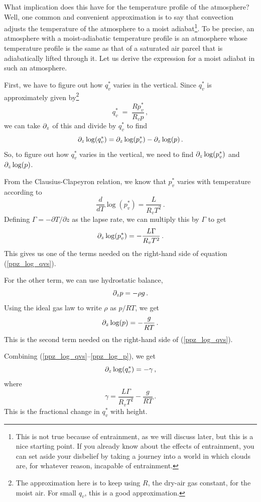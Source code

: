 \documentclass[12pt]{article}
\begin{document}
What implication does this have for the temperature profile of the atmosphere?  Well, one common and convenient approximation is to say that convection adjusts the temperature of the atmosphere to a moist adiabat\footnote{This is not true because of entrainment, as we will discuss later, but this is a nice starting point.  If you already know about the effects of entrainment, you can set aside your disbelief by taking a journey into a world in which clouds are, for whatever reason, incapable of entrainment.}.  To be precise, an atmosphere with a moist-adiabatic temperature profile is an atmosphere whose temperature profile is the same as that of a saturated air parcel that is adiabatically lifted through it.  Let us derive the expression for a moist adiabat in such an atmosphere.


First, we have to figure out how $q_v^*$ varies in the vertical.  Since $q_v^*$ is approximately given by\footnote{The approximation here is to keep using $R$, the dry-air gas constant, for the moist air.  For small $q_v$, this is a good approximation.}
\[
q_v^* \; = \; \frac{Rp_v^*}{R_v p} \, ,
\]
we can take $\partial_z$ of this and divide by $q_v^*$ to find
\begin{equation}
\partial_z \log(q_v^*) = \partial_z \log(p_v^*) - \partial_z \log(p) \, . \label{ppz_log_qvs}
\end{equation}
So, to figure out how $q_v^*$ varies in the vertical, we need to find $\partial_z \log(p_v^*)$ and $\partial_z \log(p)$.  


From the Clausius-Clapeyron relation, we know that $p_v^*$ varies with temperature according to
\[
\frac{d}{dT} \log(p_v^*) = \frac{L}{R_v T^2} \, .
\]
Defining $\Gamma = -\partial T / \partial z$ as the lapse rate, we can multiply this by $\Gamma$ to get
\begin{equation}
\partial_z \log(p_v^*) = - \frac{L\Gamma}{R_v T^2} \, . \label{ppz_log_pvs}
\end{equation}
This gives us one of the terms needed on the right-hand side of equation (\ref{ppz_log_qvs}).


For the other term, we can use hydrostatic balance,
\[
\partial_z p = -\rho g \, .
\]
Using the ideal gas law to write $\rho$ as $p/RT$, we get
\begin{equation}
\partial_z \log(p) = -\frac{g}{RT} \, . \label{ppz_log_p}
\end{equation}
This is the second term needed on the right-hand side of (\ref{ppz_log_qvs}).


Combining (\ref{ppz_log_qvs}--\ref{ppz_log_p}), we get
\begin{equation}
\partial_z \log(q_v^*) = -\gamma \, ,
\end{equation}
where
\begin{equation}
\gamma = \frac{L\Gamma}{R_v T^2} - \frac{g}{RT} \, . \label{gamma}
\end{equation}
This is the fractional change in $q_v^*$ with height.
\end{document}
